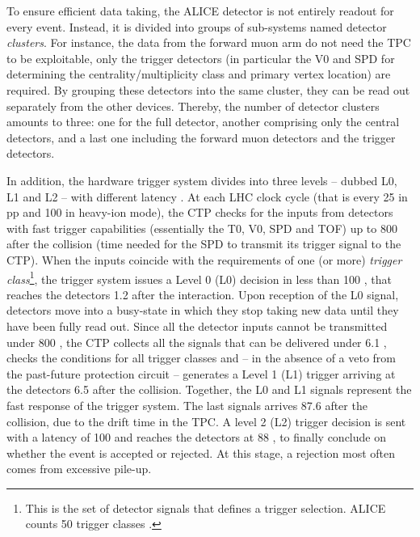 To ensure efficient data taking, the ALICE detector is not entirely readout for every event. Instead, it is divided into groups of sub-systems named detector \textit{clusters}. For instance, the data from the forward muon arm do not need the TPC to be exploitable, only the trigger detectors (in particular the V0 and SPD for determining the centrality/multiplicity class and primary vertex location) are required. By grouping these detectors into the same cluster, they can be read out separately from the other devices. Thereby, the number of detector clusters amounts to three: one for the full detector, another comprising only the central detectors, and a last one including the forward muon detectors and the trigger detectors.

In addition, the hardware trigger system divides into three levels -- dubbed L0, L1 and L2 -- with different latency \cite{bloodworthALICECentralTrigger2000}\cite{alicecollaborationTriggerDataAcquisition2004}. At each LHC clock cycle (that is every 25 \nsec in pp and 100 \nsec in heavy-ion mode), the CTP checks for the inputs from detectors with fast trigger capabilities (essentially the T0, V0, SPD and TOF) up to 800 \nsec after the collision (time needed for the SPD to transmit its trigger signal to the CTP). When the inputs coincide with the requirements of one (or more) \textit{trigger class}\footnote{This is the set of detector signals that defines a trigger selection. ALICE counts 50 trigger classes \cite{alicecollaborationALICEExperimentCERN2008}.}, the trigger system issues a Level 0 (L0) decision in less than 100 \nsec, that reaches the detectors 1.2 \musec after the interaction. Upon reception of the L0 signal, detectors move into a busy-state in which they stop taking new data until they have been fully read out. Since all the detector inputs cannot be transmitted under 800 \nsec, the CTP collects all the signals that can be delivered under 6.1 \musec, checks the conditions for all trigger classes and -- in the absence of a veto from the past-future protection circuit -- generates a Level 1 (L1) trigger arriving at the detectors 6.5 \musec after the collision. Together, the L0 and L1 signals represent the fast response of the trigger system. The last signals arrives 87.6 \musec after the collision, due to the drift time in the TPC. A level 2 (L2) trigger decision is sent with a latency of 100 \nsec and reaches the detectors at 88 \musec, to finally conclude on whether the event is accepted or rejected. At this stage, a rejection most often comes from excessive pile-up.\\

